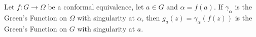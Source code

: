 Let $f: G \to \Omega$ be a conformal equivalence, let $a \in G$ and $\alpha = f(a)$. If $\gamma_\alpha$ is the Green's Function on $\Omega$ with singularity at $\alpha$, then $g_a(z) = \gamma_\alpha(f(z))$ is the Green's Function on $G$ with singularity at $a$.
